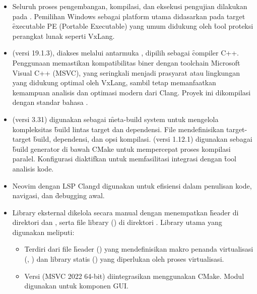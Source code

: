 \begin{itemize}
    \item {} Seluruh proses pengembangan, kompilasi, dan eksekusi pengujian dilakukan pada . Pemilihan Windows sebagai platform utama didasarkan pada target \f{executable} PE (Portable Executable) yang umum didukung oleh \f{tool} proteksi perangkat lunak seperti VxLang.
    \item {}  (versi 19.1.3), diakses melalui antarmuka , dipilih sebagai \f{compiler} C++. Penggunaan  memastikan kompatibilitas biner dengan toolchain Microsoft Visual C++ (MSVC), yang seringkali menjadi prasyarat atau lingkungan yang didukung optimal oleh VxLang, sambil tetap memanfaatkan kemampuan analisis dan optimasi modern dari Clang. Proyek ini dikompilasi dengan standar bahasa .
    \item {}  (versi 3.31) digunakan sebagai \f{meta-build system} untuk mengelola kompleksitas \f{build} lintas target dan dependensi. File  mendefinisikan target-target \f{build}, dependensi, dan opsi kompilasi.  (versi 1.12.1) digunakan sebagai \f{build generator} di bawah CMake untuk mempercepat proses kompilasi paralel. Konfigurasi  diaktifkan untuk memfasilitasi integrasi dengan \f{tool} analisis kode.
    \item {} Neovim dengan LSP Clangd digunakan untuk efisiensi dalam penulisan kode, navigasi, dan \f{debugging} awal.
    \item {} Library eksternal dikelola secara manual dengan menempatkan \f{header} di direktori  dan , serta file library () di direktori . Library utama yang digunakan meliputi:
          \begin{itemize}
              \item {} Terdiri dari file \f{header} () yang mendefinisikan makro penanda virtualisasi (, ) dan library statis () yang diperlukan oleh proses virtualisasi.
              \item {} Versi  (MSVC 2022 64-bit) diintegrasikan menggunakan  CMake. Modul  digunakan untuk komponen GUI.

\end{itemize}
\end{itemize}

